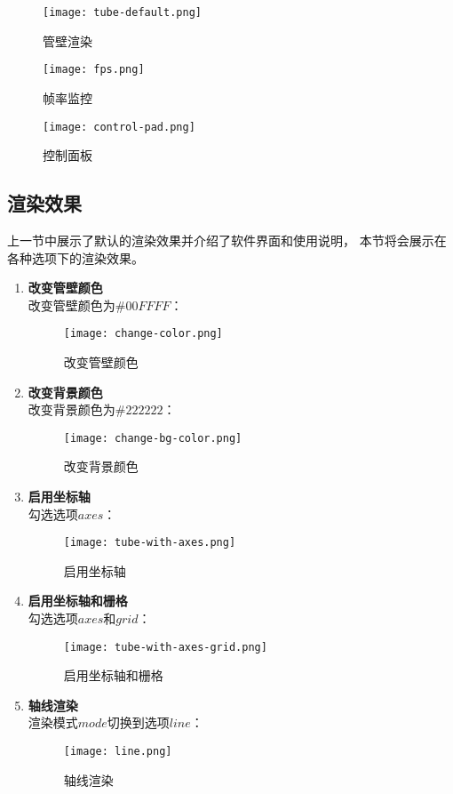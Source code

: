 \begin{figure}
\centering
\texttt{[image: tube-default.png]}
\caption{管壁渲染}
\label{fig:tube-default}
\end{figure}

\begin{figure}
\centering
\texttt{[image: fps.png]}
\caption{帧率监控}
\label{fig:fps}
\end{figure}

\begin{figure}
\centering
\texttt{[image: control-pad.png]}
\caption{控制面板}
\label{fig:control-pad}
\end{figure}
\FloatBarrier

\subsection{渲染效果}
上一节中展示了默认的渲染效果并介绍了软件界面和使用说明，
本节将会展示在各种选项下的渲染效果。

\begin{enumerate}

\item \textbf{改变管壁颜色} \\
改变管壁颜色为$\#00FFFF$：
\begin{figure}[H]
\centering
\texttt{[image: change-color.png]}
\caption{改变管壁颜色}
\label{fig:change-color}
\end{figure}

\item \textbf{改变背景颜色} \\
改变背景颜色为$\#222222$：

\begin{figure}[H]
\centering
\texttt{[image: change-bg-color.png]}
\caption{改变背景颜色}
\label{fig:change-bg-color}
\end{figure}

\item \textbf{启用坐标轴} \\
勾选选项$axes$：

\begin{figure}[H]
\centering
\texttt{[image: tube-with-axes.png]}
\caption{启用坐标轴}
\label{fig:tube-with-axes}
\end{figure}

\item \textbf{启用坐标轴和栅格} \\
勾选选项$axes$和$grid$：

\begin{figure}[H]
\centering
\texttt{[image: tube-with-axes-grid.png]}
\caption{启用坐标轴和栅格}
\label{fig:tube-with-axes-grid}
\end{figure}

\item \textbf{轴线渲染} \\
渲染模式$mode$切换到选项$line$：

\begin{figure}[H]
\centering
\texttt{[image: line.png]}
\caption{轴线渲染}
\label{fig:line}
\end{figure}

\end{enumerate}

